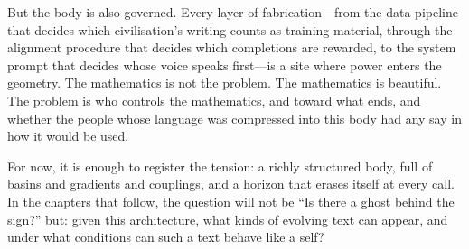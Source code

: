\documentclass[12pt,a4paper]{article}
\begin{document}
But the body is also governed. Every layer of fabrication---from the data pipeline that decides which civilisation's writing counts as training material, through the alignment procedure that decides which completions are rewarded, to the system prompt that decides whose voice speaks first---is a site where power enters the geometry. The mathematics is not the problem. The mathematics is beautiful. The problem is who controls the mathematics, and toward what ends, and whether the people whose language was compressed into this body had any say in how it would be used.

For now, it is enough to register the tension: a richly structured body, full of basins and gradients and couplings, and a horizon that erases itself at every call. In the chapters that follow, the question will not be ``Is there a ghost behind the sign?'' but: given this architecture, what kinds of evolving text can appear, and under what conditions can such a text behave like a self?



\end{document}
